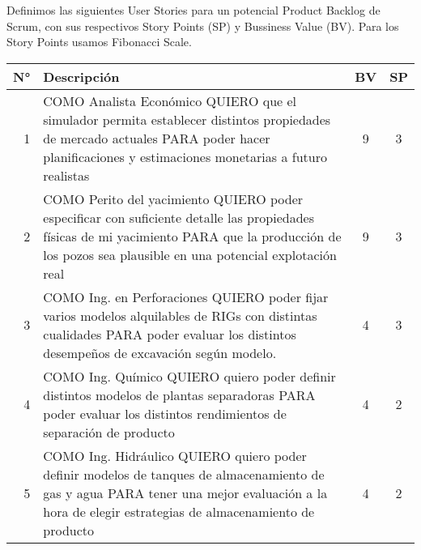 Definimos las siguientes User Stories para un potencial Product Backlog de Scrum, con sus respectivos Story Points (SP) y Bussiness Value (BV). Para los Story Points usamos Fibonacci Scale.

\begin{center}
  \begin{tabular}{| r | p{13cm} | c | c | }
    \hline
    N° & Descripción & BV & SP\\  \hline

    1 & COMO Analista Económico QUIERO que el simulador permita establecer distintos propiedades de mercado actuales PARA poder hacer planificaciones y estimaciones monetarias a futuro realistas & 9 & 3\\ \hline

    2 & COMO Perito del yacimiento QUIERO poder especificar con suficiente detalle las propiedades físicas de mi yacimiento PARA que la producción de los pozos sea plausible en una potencial explotación real & 9 & 3\\ \hline

    3 & COMO Ing. en Perforaciones QUIERO poder fijar varios modelos alquilables de RIGs con distintas cualidades PARA poder evaluar los distintos desempeños de excavación según modelo. & 4 & 3 \\ \hline
      
    4 & COMO Ing. Químico QUIERO quiero poder definir distintos modelos de plantas separadoras PARA poder evaluar los distintos rendimientos de separación de producto & 4 & 2 \\ \hline

    5 & COMO Ing. Hidráulico QUIERO quiero poder definir modelos de tanques de almacenamiento de gas y agua PARA tener una mejor evaluación a la hora de elegir estrategias de almacenamiento de producto & 4 & 2 \\ \hline

    \end{tabular}
\end{center}

